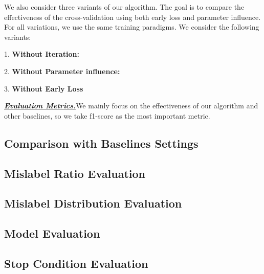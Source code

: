 We also consider three variants of our algorithm. The goal is to compare the effectiveness of the cross-validation using both early loss and parameter influence. For all variations, we use the same training paradigms. We consider the following variants:

1. \textbf{Without Iteration: } 

2. \textbf{Without Parameter influence:} 

3. \textbf{Without Early Loss}

\textbf{\textit{\underline{Evaluation Metrics.}}}We mainly focus on the effectiveness of our algorithm and other baselines, so we take f1-score as the most important metric.

\subsection{Comparison with Baselines Settings}

\subsection{Mislabel Ratio Evaluation}

\subsection{Mislabel Distribution Evaluation}

\subsection{Model Evaluation}

\subsection{Stop Condition Evaluation}
